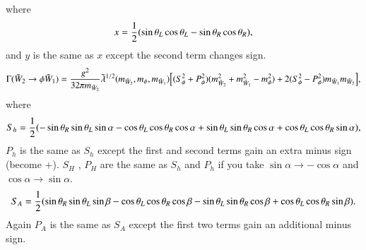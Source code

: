 \documentclass[final,3p,times]{elsarticle}
\begin{document}
where
\begin{equation}
x = {1 \over 2}(\sin \theta_L \cos \theta_L - \sin \theta_R \cos \theta_R),
\end{equation}
and $y$ is the same as $x$ except the second term changes sign.
\begin{equation}\label{ch2phich1}
\Gamma (\tilde{W}_2 \rightarrow \phi \tilde{W}_1) = {g^2 \over 32\pi m_{\tilde{W}_2} } \tilde{\lambda}^{1/2} (m_{\tilde{W}_2}, m_{\phi}, m_{\tilde{W}_1}) \Big[(S_{\phi}^2 + P_{\phi}^2) (m_{\tilde{W}_{2}}^2  + m_{\tilde{W}_{1}}^2 - m_{\phi}^2)  + 2(S_{\phi}^2 -P_{\phi}^2)m_{\tilde{W}_{1}}m_{\tilde{W}_{2}}\Big],
\end{equation} 
where
\begin{equation}
S_h = {1 \over 2} (-\sin \theta_R \sin \theta_L \sin \alpha - \cos \theta_L \cos \theta_R \cos \alpha + \sin \theta_L \sin \theta_R \cos \alpha + \cos \theta_L \cos \theta_R \sin \alpha )  ,
\end{equation}
$P_h$ is the same as $S_h$ except the first and second terms gain an extra minus sign (become +).
$S_H$ , $P_H$ are the same as $S_h$ and $P_h$ if you take $\sin\alpha \rightarrow -\cos\alpha$ and $\cos\alpha \rightarrow \sin\alpha$.
\begin{equation}
S_A = {1 \over 2} (\sin \theta_R \sin \theta_L \sin \beta - \cos \theta_L \cos \theta_R \cos \beta - \sin \theta_L \sin \theta_R \cos \beta + \cos \theta_L \cos \theta_R \sin \beta ).
\end{equation}
Again $P_A$ is the same as $S_A$ except the first two terms gain an additional
minus sign.
\end{document}
